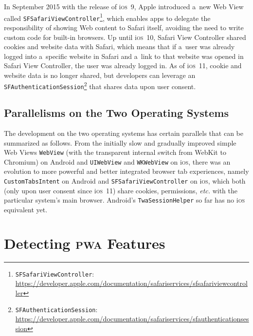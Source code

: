 \documentclass[sigconf]{acmart}
\begin{document}
In September 2015 with the release of i\textsc{os}~9, Apple introduced a~new Web View called
\texttt{SFSafariViewController}\footnote{\texttt{SFSafariViewController}:
\url{https://developer.apple.com/documentation/safariservices/sfsafariviewcontroller}},
which enables apps to delegate the responsibility of showing Web content to Safari itself,
avoiding the need to write custom code for built-in browsers.
Up until i\textsc{os}~10, Safari View Controller shared cookies and website data with Safari,
which means that if a~user was already logged into a~specific website in Safari
and a~link to that website was opened in Safari View Controller,
the user was already logged in.
As of i\textsc{os}~11, cookie and website data is no longer shared,
but developers can leverage
an \texttt{SFAuthenticationSession}\footnote{\texttt{SFAuthenticationSession}:
\url{https://developer.apple.com/documentation/safariservices/sfauthenticationsession}}
that shares data upon user consent. 

\subsection{Parallelisms on the Two Operating Systems}

The development on the two operating systems has certain parallels
that can be summarized as follows.
From the initially slow and gradually improved simple Web Views \texttt{WebView}
(with the transparent internal switch from WebKit to Chromium)
on Android and \texttt{UIWebView} and \texttt{WKWebView} on i\textsc{os},
there was an evolution to more powerful and better integrated browser tab experiences,
namely \texttt{CustomTabsIntent} on Android and
\texttt{SFSafariViewController} on i\textsc{os},
which both (only upon user consent since i\textsc{os}~11)
share cookies, permissions, \emph{etc.}
with the particular system's main browser.
Android's \texttt{TwaSessionHelper} so far has no i\textsc{os} equivalent yet.

\section{Detecting \textsc{pwa} Features}
\label{sec:pwa-feature-detector}
\end{document}
